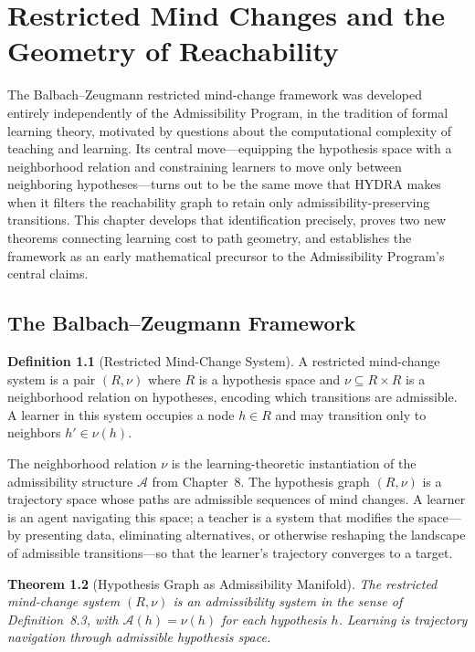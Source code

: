 \documentclass[12pt, oneside]{book}
\theoremstyle{flyxion}
\newtheorem{theorem}{Theorem}[chapter]
\theoremstyle{definition}
\newtheorem{definition}[theorem]{Definition}
\begin{document}
\bigskip

\chapter{Restricted Mind Changes and the Geometry
of Reachability}

The Balbach--Zeugmann restricted mind-change framework
was developed entirely independently of the Admissibility
Program, in the tradition of formal learning theory,
motivated by questions about the computational complexity
of teaching and learning. Its central move---equipping
the hypothesis space with a neighborhood relation and
constraining learners to move only between neighboring
hypotheses---turns out to be the same move that HYDRA
makes when it filters the reachability graph to retain
only admissibility-preserving transitions. This chapter
develops that identification precisely, proves two new
theorems connecting learning cost to path geometry, and
establishes the framework as an early mathematical
precursor to the Admissibility Program's central claims.

\section{The Balbach--Zeugmann Framework}

\begin{definition}[Restricted Mind-Change System]
A restricted mind-change system is a pair $(R, \nu)$
where $R$ is a hypothesis space and $\nu \subseteq
R \times R$ is a neighborhood relation on hypotheses,
encoding which transitions are admissible. A learner
in this system occupies a node $h \in R$ and may
transition only to neighbors $h' \in \nu(h)$.
\end{definition}

The neighborhood relation $\nu$ is the learning-theoretic
instantiation of the admissibility structure
$\mathcal{A}$ from Chapter~8. The hypothesis graph
$(R, \nu)$ is a trajectory space whose paths are
admissible sequences of mind changes. A learner is an
agent navigating this space; a teacher is a system
that modifies the space---by presenting data, eliminating
alternatives, or otherwise reshaping the landscape of
admissible transitions---so that the learner's trajectory
converges to a target.

\begin{theorem}[Hypothesis Graph as Admissibility Manifold]
The restricted mind-change system $(R, \nu)$ is an
admissibility system in the sense of Definition~8.3,
with $\mathcal{A}(h) = \nu(h)$ for each hypothesis $h$.
Learning is trajectory navigation through admissible
hypothesis space.
\end{theorem}
\end{document}
